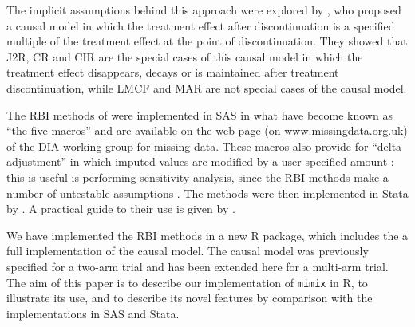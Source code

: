 The implicit assumptions behind this approach were explored by \citet{ian:RBIcausal}, who proposed a causal model in which the treatment effect after discontinuation is a specified multiple of the treatment effect at the point of discontinuation. They showed that J2R, CR and CIR are the special cases of this causal model in which the treatment effect disappears, decays or is maintained after treatment discontinuation, while LMCF and MAR are not special cases of the causal model. 

The RBI methods of \citet{Carpenter++13} were implemented in SAS in what have become known as ``the five macros'' and are available on the web page (on www.missingdata.org.uk) of the DIA working group for missing data. These macros also provide for ``delta adjustment'' in which imputed values are modified by a user-specified amount \citep{Ratitch++13}: this is useful is performing sensitivity analysis, since the RBI methods make a number of untestable assumptions \citep{ian:ZAMSTAR}.
The methods were then implemented in Stata by \citet{Cro++16}.
A practical guide to their use is given by \citet{Cro++20}.

We have implemented the RBI methods in a new R package, which includes the a full implementation of the causal model. 
The causal model was previously specified for a two-arm trial and has been extended here for a multi-arm trial.
The aim of this paper is to describe our implementation of \texttt{mimix} in R, to illustrate its use, and to describe its novel features by comparison with the implementations in SAS and Stata.

%
%

%
%

